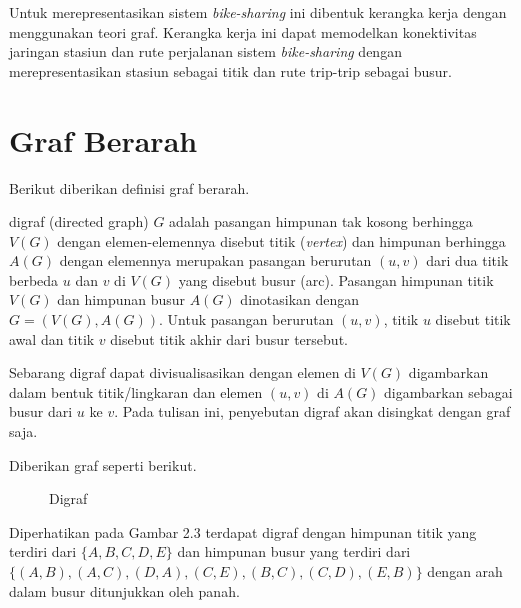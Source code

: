 Untuk merepresentasikan sistem \textit{bike-sharing} ini dibentuk kerangka kerja dengan menggunakan teori graf. Kerangka kerja ini dapat memodelkan konektivitas jaringan stasiun dan rute perjalanan sistem \textit{bike-sharing} dengan merepresentasikan stasiun sebagai titik dan rute trip-trip sebagai busur.

\section{Graf Berarah}
    Berikut diberikan definisi graf berarah.

\begin{definisi}
    digraf (directed graph) $G$ adalah pasangan himpunan tak kosong berhingga $V(G)$ dengan elemen-elemennya disebut titik (\textit{vertex}) dan himpunan berhingga $A(G)$ dengan elemennya merupakan pasangan berurutan $(u,v)$ dari dua titik berbeda $u$ dan $v$ di $V(G)$ yang disebut busur (arc). Pasangan himpunan titik $V(G)$ dan himpunan busur $A(G)$ dinotasikan dengan $G = (V(G), A(G))$. Untuk pasangan berurutan $(u,v)$, titik $u$ disebut titik awal dan titik $v$ disebut titik akhir dari busur tersebut.
\end{definisi}

Sebarang digraf dapat divisualisasikan dengan elemen di $V(G)$ digambarkan dalam bentuk titik/lingkaran dan elemen $(u,v)$ di $A(G)$ digambarkan sebagai busur dari $u$ ke $v$. Pada tulisan ini, penyebutan digraf akan disingkat dengan graf saja.

\begin{contoh}\label{contoh_digraph}
    Diberikan graf seperti berikut.\\
    \begin{figure}[H]
        \centering
        \caption{Digraf}
        \label{Digraph}
    \end{figure}

    Diperhatikan pada Gambar 2.3 terdapat digraf dengan himpunan titik yang terdiri dari $\{A,B,C,D,E\}$ dan himpunan busur yang terdiri dari $\{(A,B),(A,C),(D,A),(C,E),(B,C),(C,D),(E,B)\}$ dengan arah dalam busur ditunjukkan oleh panah. 
\end{contoh}

